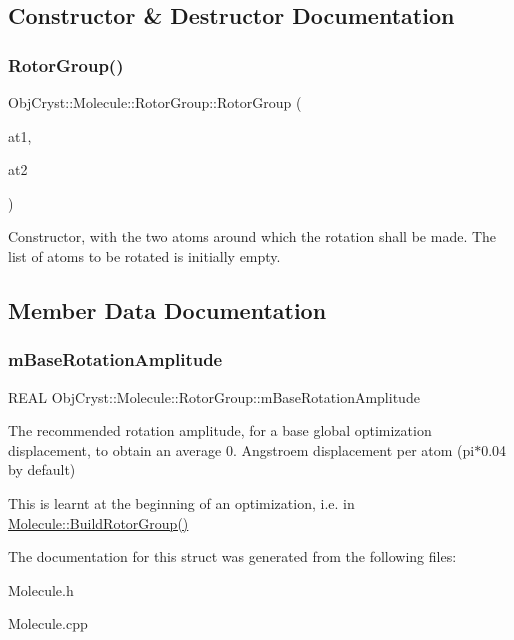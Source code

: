 \subsection{Constructor \& Destructor Documentation}
\mbox{\label{struct_obj_cryst_1_1_molecule_1_1_rotor_group_a04efc612bcdfd3c84132e6dc0c54bf92}} 
\subsubsection{\texorpdfstring{RotorGroup()}{RotorGroup()}}
{\footnotesize\ttfamily Obj\+Cryst\+::\+Molecule\+::\+Rotor\+Group\+::\+Rotor\+Group (\begin{DoxyParamCaption}\item[{const \mbox{\hyperlink{class_obj_cryst_1_1_mol_atom}{Mol\+Atom}} \&}]{at1,  }\item[{const \mbox{\hyperlink{class_obj_cryst_1_1_mol_atom}{Mol\+Atom}} \&}]{at2 }\end{DoxyParamCaption})}

Constructor, with the two atoms around which the rotation shall be made. The list of atoms to be rotated is initially empty. 

\subsection{Member Data Documentation}
\mbox{\label{struct_obj_cryst_1_1_molecule_1_1_rotor_group_ab98013a7f74a26ebe8d04c066f9ea49d}} 
\subsubsection{\texorpdfstring{mBaseRotationAmplitude}{mBaseRotationAmplitude}}
{\footnotesize\ttfamily R\+E\+AL Obj\+Cryst\+::\+Molecule\+::\+Rotor\+Group\+::m\+Base\+Rotation\+Amplitude}

The recommended rotation amplitude, for a base global optimization displacement, to obtain an average 0. Angstroem displacement per atom (pi$\ast$0.04 by default)

This is learnt at the beginning of an optimization, i.\+e. in \mbox{\hyperlink{class_obj_cryst_1_1_molecule_a3642fa8104faa1ce84a977600f9d1aeb}{Molecule\+::\+Build\+Rotor\+Group()}} 

The documentation for this struct was generated from the following files\+:\begin{DoxyCompactItemize}
\item 
Molecule.\+h\item 
Molecule.\+cpp\end{DoxyCompactItemize}
